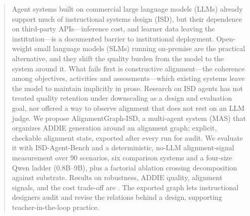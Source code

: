 \begin{abstract}
Agent systems built on commercial large language models (LLMs) already support
much of instructional systems design (ISD), but their dependence on third-party
APIs---inference cost, and learner data leaving the institution---is a documented
barrier to institutional deployment. Open-weight small language
models (SLMs) running on-premise are the practical alternative, and they shift the quality
burden from the model to the system around it. What fails first is constructive
alignment---the coherence among objectives, activities and assessments---which
existing systems leave the model to maintain implicitly in prose. Research on ISD agents has not treated quality retention under downscaling as a
design and evaluation goal, nor offered a way to observe alignment that does not
rest on an LLM judge. We propose
AlignmentGraph-ISD, a multi-agent system (MAS) that organizes ADDIE generation
around an alignment graph: explicit, checkable alignment state, exported after
every run for audit. We evaluate it with ISD-Agent-Bench and a deterministic,
no-LLM alignment-signal measurement over 90 scenarios, six comparison systems and a
four-size Qwen ladder (0.8B--9B), plus a factorial ablation crossing decomposition
against substrate. Results on robustness, ADDIE quality, alignment
signals, and the cost trade-off are \TBD. The exported graph lets instructional designers audit and revise
the relations behind a design, supporting teacher-in-the-loop practice.
\end{abstract}
